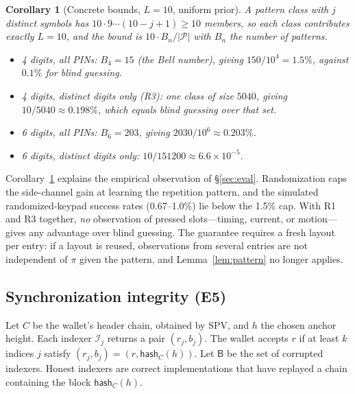 \documentclass[11pt]{article}
\newtheorem{corollary}{Corollary}
\theoremstyle{remark}
\begin{document}
\begin{corollary}[Concrete bounds, $L = 10$, uniform prior]
\label{cor:rand}
A pattern class with $j$ distinct symbols has $10\cdot 9 \cdots (10-j+1) \ge 10$ members, so each class contributes exactly $L = 10$, and the bound is $10\cdot B_n/|\mathcal{P}|$ with $B_n$ the number of patterns.
\begin{itemize}
  \item 4 digits, all PINs: $B_4 = 15$ (the Bell number), giving $150/10^4 = 1.5\%$, against $0.1\%$ for blind guessing.
  \item 4 digits, distinct digits only (R3): one class of size $5040$, giving $10/5040 \approx 0.198\%$, which equals blind guessing over that set.
  \item 6 digits, all PINs: $B_6 = 203$, giving $2030/10^6 \approx 0.203\%$.
  \item 6 digits, distinct digits only: $10/151200 \approx 6.6\times 10^{-5}$.
\end{itemize}
\end{corollary}

Corollary~\ref{cor:rand} explains the empirical observation of §\ref{sec:eval}. Randomization caps the side-channel gain at learning the repetition pattern, and the simulated randomized-keypad success rates (0.67--1.0\%) lie below the 1.5\% cap. With R1 and R3 together, \emph{no} observation of pressed slots---timing, current, or motion---gives any advantage over blind guessing. The guarantee requires a fresh layout per entry: if a layout is reused, observations from several entries are not independent of $\pi$ given the pattern, and Lemma~\ref{lem:pattern} no longer applies.

\subsection{Synchronization integrity (E5)}

Let $C$ be the wallet's header chain, obtained by SPV, and $h$ the chosen anchor height. Each indexer $\mathcal{I}_j$ returns a pair $(r_j, b_j)$. The wallet accepts $r$ if at least $k$ indices $j$ satisfy $(r_j, b_j) = (r, \mathsf{hash}_C(h))$. Let $\mathsf{B}$ be the set of corrupted indexers. Honest indexers are correct implementations that have replayed a chain containing the block $\mathsf{hash}_C(h)$.
\end{document}
